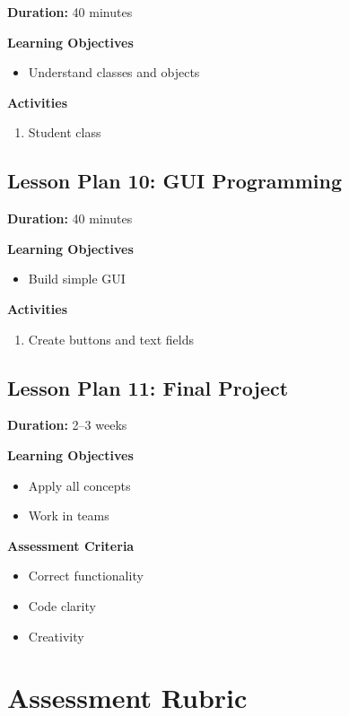 \textbf{Duration:} 40 minutes

\textbf{Learning Objectives}
\begin{itemize}
    \item Understand classes and objects
\end{itemize}

\textbf{Activities}
\begin{enumerate}
    \item Student class
\end{enumerate}

\subsection*{Lesson Plan 10: GUI Programming}

\textbf{Duration:} 40 minutes

\textbf{Learning Objectives}
\begin{itemize}
    \item Build simple GUI
\end{itemize}

\textbf{Activities}
\begin{enumerate}
    \item Create buttons and text fields
\end{enumerate}

\subsection*{Lesson Plan 11: Final Project}

\textbf{Duration:} 2--3 weeks

\textbf{Learning Objectives}
\begin{itemize}
    \item Apply all concepts
    \item Work in teams
\end{itemize}

\textbf{Assessment Criteria}
\begin{itemize}
    \item Correct functionality
    \item Code clarity
    \item Creativity
\end{itemize}

\section*{Assessment Rubric}

